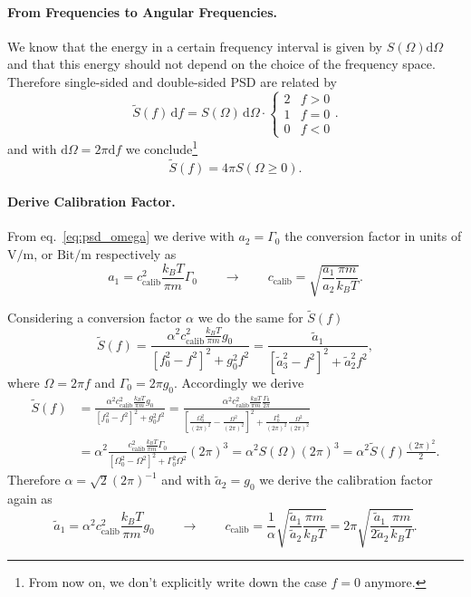 \documentclass[10pt,a4paper]{article}
\begin{document}
	\paragraph{From Frequencies to Angular Frequencies.}
	We know that the energy in a certain frequency interval is given by $S(\Omega)\mathrm{d}\Omega$ and that this energy should not depend on the choice of the frequency space. Therefore single-sided and double-sided PSD are related by
	\begin{equation}
		\tilde{S}(f)\,\mathrm{d}f = S(\Omega)\,\mathrm{d}\Omega\cdot\begin{cases}
		2 & f>0\\
		1 & f=0\\
		0 & f<0
		\end{cases}.
	\end{equation}
	and with $\mathrm{d}\Omega=2\pi\mathrm{d}f$ we conclude\footnote{From now on, we don't explicitly write down the case $f=0$ anymore.}
	\begin{equation}
		\tilde{S}(f) = 4\pi S(\Omega \geq 0).
	\end{equation}
	
	\paragraph{Derive Calibration Factor.}
	From eq.\ \ref{eq:psd_omega} we derive with $a_2=\Gamma_0$ the conversion factor in units of $\mathrm{V}/\mathrm{m}$, or $\mathrm{Bit}/\mathrm{m}$ respectively as
	\begin{equation}
		a_1 = c_\text{calib}^2\frac{k_BT}{\pi m}\Gamma_0 \qquad\rightarrow\qquad c_\text{calib} = \sqrt{\frac{a_1}{a_2}\frac{\pi m}{k_BT}}.
	\end{equation}
	
	Considering a conversion factor $\alpha$ we do the same for $\tilde{S}(f)$
	\begin{equation}
		\tilde{S}(f)=\frac{\alpha^2c_\text{calib}^2\frac{k_BT}{\pi m}g_0}{[f_0^2-f^2]^2+g_0^2f^2} = \frac{\tilde{a}_1}{[\tilde{a}_3^2-f^2]^2+\tilde{a}_2^2f^2},
	\end{equation}
	where $\Omega=2\pi f$ and $\Gamma_0=2\pi g_0$. Accordingly we derive
	\begin{align}
		\tilde{S}(f) &= \frac{\alpha^2c_\text{calib}^2\frac{k_BT}{\pi m}g_0}{[f_0^2-f^2]^2+g_0^2f^2} = \frac{\alpha^2c_\text{calib}^2\frac{k_BT}{\pi m}\frac{\Gamma_0}{2\pi}}{\left[\frac{\Omega_0^2}{(2\pi)^2}-\frac{\Omega^2}{(2\pi)^2}\right]^2+\frac{\Gamma_0^2}{(2\pi)^2}\frac{\Omega^2}{(2\pi)^2}}\\
		&=\alpha^2\frac{c_\text{calib}^2\frac{k_BT}{\pi m}\Gamma_0}{[\Omega_0^2-\Omega^2]^2+\Gamma_0^2\Omega^2}(2\pi)^3 =\alpha^2 S(\Omega) (2\pi)^3 = \alpha^2 \tilde{S}(f) \frac{(2\pi)^2}{2}.
	\end{align}
	Therefore $\alpha=\sqrt{2}(2\pi)^{-1}$ and with $\tilde{a}_2=g_0$ we derive the calibration factor again as
	\begin{equation}
		\tilde{a}_1 = \alpha^2c_\text{calib}^2\frac{k_BT}{\pi m}g_0 \qquad\rightarrow\qquad c_\text{calib} = \frac{1}{\alpha}\sqrt{\frac{\tilde{a}_1}{\tilde{a}_2}\frac{\pi m}{k_BT}} = 2\pi\sqrt{\frac{\tilde{a}_1}{2\tilde{a}_2}\frac{\pi m}{k_BT}}.
	\end{equation}
	
\end{document}
